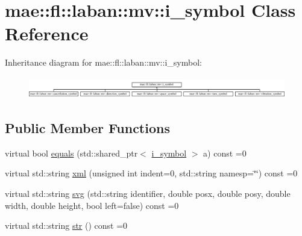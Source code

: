 \hypertarget{classmae_1_1fl_1_1laban_1_1mv_1_1i__symbol}{\section{mae\-:\-:fl\-:\-:laban\-:\-:mv\-:\-:i\-\_\-symbol Class Reference}
\label{classmae_1_1fl_1_1laban_1_1mv_1_1i__symbol}
}
Inheritance diagram for mae\-:\-:fl\-:\-:laban\-:\-:mv\-:\-:i\-\_\-symbol\-:\begin{figure}[H]
\begin{center}
\leavevmode
\includegraphics[height=0.953192cm]{classmae_1_1fl_1_1laban_1_1mv_1_1i__symbol}
\end{center}
\end{figure}
\subsection*{Public Member Functions}
\begin{DoxyCompactItemize}
\item 
virtual bool \hyperlink{classmae_1_1fl_1_1laban_1_1mv_1_1i__symbol_a78d90af5e1da4a6561d7545a76689d0e}{equals} (std\-::shared\-\_\-ptr$<$ \hyperlink{classmae_1_1fl_1_1laban_1_1mv_1_1i__symbol}{i\-\_\-symbol} $>$ a) const =0
\item 
virtual std\-::string \hyperlink{classmae_1_1fl_1_1laban_1_1mv_1_1i__symbol_a05d0b0c74bad854d5e9e3291bbd87b0d}{xml} (unsigned int indent=0, std\-::string namesp=\char`\"{}\char`\"{}) const =0
\item 
virtual std\-::string \hyperlink{classmae_1_1fl_1_1laban_1_1mv_1_1i__symbol_ae0a724c98c27c05fdde9afff99184029}{svg} (std\-::string identifier, double posx, double posy, double width, double height, bool left=false) const =0
\item 
virtual std\-::string \hyperlink{classmae_1_1fl_1_1laban_1_1mv_1_1i__symbol_ad254351eabf06ac945c168b24643872e}{str} () const =0
\end{DoxyCompactItemize}
